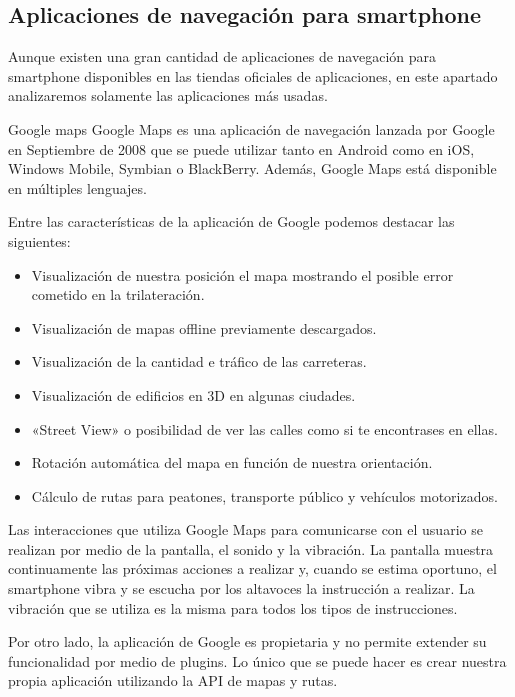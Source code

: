 \subsection{Aplicaciones de navegación para smartphone}

Aunque existen una gran cantidad de aplicaciones de navegación para smartphone disponibles en las
tiendas oficiales de aplicaciones, en este apartado analizaremos solamente las aplicaciones más
usadas.

\begin{definitionlist}
  \item[Google maps] Google Maps es una aplicación de navegación lanzada por Google en Septiembre de
    2008 que se puede utilizar tanto en Android como en iOS, Windows Mobile, Symbian o
    BlackBerry. Además, Google Maps está disponible en múltiples lenguajes.

    Entre las características de la aplicación de Google podemos destacar las siguientes:

    \begin{itemize}
      \item Visualización de nuestra posición el mapa mostrando el posible error cometido en la
        trilateración.
      \item Visualización de mapas offline previamente descargados.
      \item Visualización de la cantidad e tráfico de las carreteras.
      \item Visualización de edificios en 3D en algunas ciudades.
      \item «Street View» o posibilidad de ver las calles como si te encontrases en ellas.
      \item Rotación automática del mapa en función de nuestra orientación.
      \item Cálculo de rutas para peatones, transporte público y vehículos motorizados.
    \end{itemize}

    Las interacciones que utiliza Google Maps para comunicarse con el usuario se realizan por medio
    de la pantalla, el sonido y la vibración. La pantalla muestra continuamente las próximas
    acciones a realizar y, cuando se estima oportuno, el smartphone vibra y se escucha por los
    altavoces la instrucción a realizar. La vibración que se utiliza es la misma para todos los
    tipos de instrucciones.

    Por otro lado, la aplicación de Google es propietaria y no permite extender su funcionalidad por
    medio de plugins. Lo único que se puede hacer es crear nuestra propia aplicación utilizando la
    \acs{API} de mapas y rutas.


\end{definitionlist}
